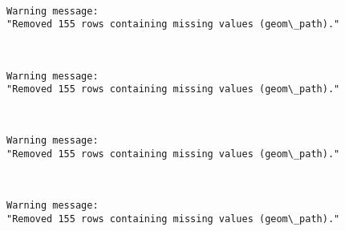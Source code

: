 \documentclass[11pt]{article}
\begin{document}
    \begin{center}
    \end{center}
    { \hspace*{\fill} \\}
    
    \begin{Verbatim}[commandchars=\\\{\}]
Warning message:
"Removed 155 rows containing missing values (geom\_path)."
    \end{Verbatim}

    \begin{center}
    \end{center}
    { \hspace*{\fill} \\}
    
    \begin{Verbatim}[commandchars=\\\{\}]
Warning message:
"Removed 155 rows containing missing values (geom\_path)."
    \end{Verbatim}

    \begin{center}
    \end{center}
    { \hspace*{\fill} \\}
    
    \begin{Verbatim}[commandchars=\\\{\}]
Warning message:
"Removed 155 rows containing missing values (geom\_path)."
    \end{Verbatim}

    \begin{center}
    \end{center}
    { \hspace*{\fill} \\}
    
    \begin{Verbatim}[commandchars=\\\{\}]
Warning message:
"Removed 155 rows containing missing values (geom\_path)."
    \end{Verbatim}

    \begin{center}
    \end{center}
    { \hspace*{\fill} \\}
    
\end{document}
